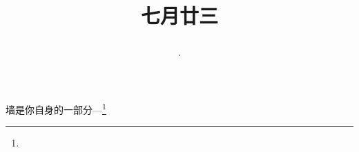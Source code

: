 \title{\date[d=26,m=8,y=2024][year:cn-y,年,month:cn,day:cn,日,·,weekday]·七月廿三 }
墙是你自身的一部分—\footnote{ }

